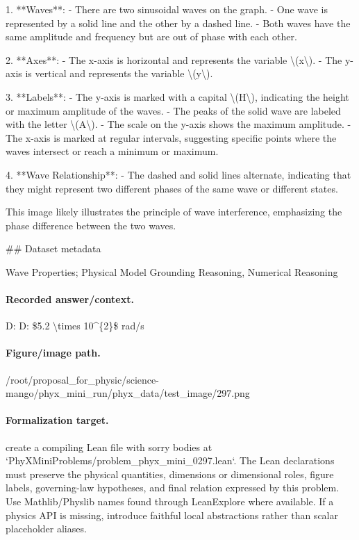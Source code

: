 1. **Waves**:
   - There are two sinusoidal waves on the graph.
   - One wave is represented by a solid line and the other by a dashed line.
   - Both waves have the same amplitude and frequency but are out of phase with each other.

2. **Axes**:
   - The x-axis is horizontal and represents the variable \textbackslash{}(x\textbackslash{}).
   - The y-axis is vertical and represents the variable \textbackslash{}(y\textbackslash{}).

3. **Labels**:
   - The y-axis is marked with a capital \textbackslash{}(H\textbackslash{}), indicating the height or maximum amplitude of the waves.
   - The peaks of the solid wave are labeled with the letter \textbackslash{}(A\textbackslash{}).
   - The scale on the y-axis shows the maximum amplitude.
   - The x-axis is marked at regular intervals, suggesting specific points where the waves intersect or reach a minimum or maximum.

4. **Wave Relationship**:
   - The dashed and solid lines alternate, indicating that they might represent two different phases of the same wave or different states.

This image likely illustrates the principle of wave interference, emphasizing the phase difference between the two waves.

\#\# Dataset metadata

Wave Properties; Physical Model Grounding Reasoning, Numerical Reasoning

\paragraph{Recorded answer/context.}
D: D: \$5.2 \textbackslash{}times 10\textasciicircum{}\{2\}\$ rad/s

\paragraph{Figure/image path.}
/root/proposal\_for\_physic/science-mango/phyx\_mini\_run/phyx\_data/test\_image/297.png

\paragraph{Formalization target.}
create a compiling Lean file with sorry bodies at `PhyXMiniProblems/problem\_phyx\_mini\_0297.lean`. The Lean declarations must preserve the physical quantities, dimensions or dimensional roles, figure labels, governing-law hypotheses, and final relation expressed by this problem.
Use Mathlib/Physlib names found through LeanExplore where available. If a physics API is missing, introduce faithful local abstractions rather than scalar placeholder aliases.

